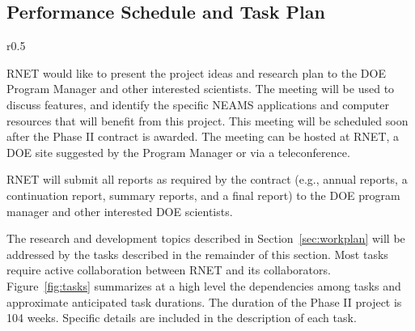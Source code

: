 


\subsection{Performance Schedule and Task Plan}
\label{sec:taskplan}

\begin{wrapfigure}{r}{0.5\linewidth}%
\begin{center}
\leavevmode
\end{center}
\caption{Overview of task dependencies and timeline.}
\label{fig:tasks}
\end{wrapfigure}

RNET would like to present the project ideas and research plan to the
DOE Program Manager and other interested scientists. The meeting will
be used to discuss features, and identify the specific NEAMS applications and computer
resources that will benefit from this project.  This meeting will be
scheduled soon after the Phase II contract is awarded. The meeting can
be hosted at RNET, a DOE site suggested by the Program Manager or via
a teleconference.

RNET will submit all reports as required by the contract (e.g., annual reports, 
a continuation report, summary reports, and a final report) to the DOE program 
manager and other interested DOE scientists.

The research and development topics described in Section~\ref{sec:workplan} 
will be addressed by the tasks described in the remainder of this section. Most 
tasks require active collaboration between RNET and its collaborators. 
Figure~\ref{fig:tasks} summarizes at a high level the dependencies among tasks  and
approximate anticipated task durations. The duration of the Phase II 
project is 104 weeks. Specific details are included in the description of each 
task.



